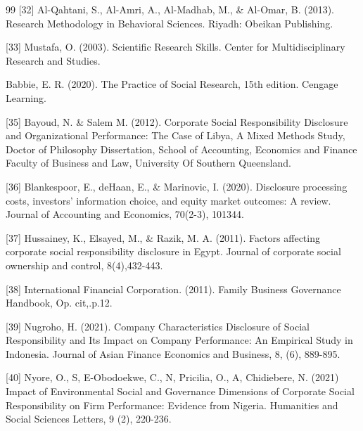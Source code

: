 \documentclass{default}
\begin{document}
\begin{thebibliography}{99}
[32] Al-Qahtani, S., Al-Amri, A., Al-Madhab, M., \& Al-Omar, B. (2013). Research Methodology in Behavioral Sciences. Riyadh: Obeikan Publishing.

[33] Mustafa, O. (2003). Scientific Research Skills. Center for Multidisciplinary Research and Studies.

Babbie, E. R. (2020). The Practice of Social Research, 15th edition. Cengage Learning.

[35] Bayoud, N. \& Salem M. (2012). Corporate Social Responsibility Disclosure and Organizational Performance: The Case of Libya, A Mixed Methods Study, Doctor of Philosophy Dissertation, School of Accounting, Economics and Finance Faculty of Business and Law, University Of Southern Queensland.

[36] Blankespoor, E., deHaan, E., \& Marinovic, I. (2020). Disclosure processing costs, investors’ information choice, and equity market outcomes: A review. Journal of Accounting and Economics, 70(2-3), 101344.

[37] Hussainey, K., Elsayed, M., \& Razik, M. A. (2011). Factors affecting corporate social responsibility disclosure in Egypt. Journal of corporate social ownership and control, 8(4),432-443.

[38] International Financial Corporation. (2011). Family Business Governance Handbook, Op. cit,.p.12.

[39] Nugroho, H. (2021). Company Characteristics Disclosure of Social Responsibility and Its Impact on Company Performance: An Empirical Study in Indonesia. Journal of Asian Finance Economics and Business, 8, (6), 889-895.

[40] Nyore, O., S, E-Obodoekwe, C., N, Pricilia, O., A, Chidiebere, N. (2021)  Impact of Environmental Social and Governance Dimensions of Corporate Social Responsibility on Firm Performance: Evidence from Nigeria. Humanities and Social Sciences Letters, 9 (2), 220-236.

\end{thebibliography}
\end{document}
